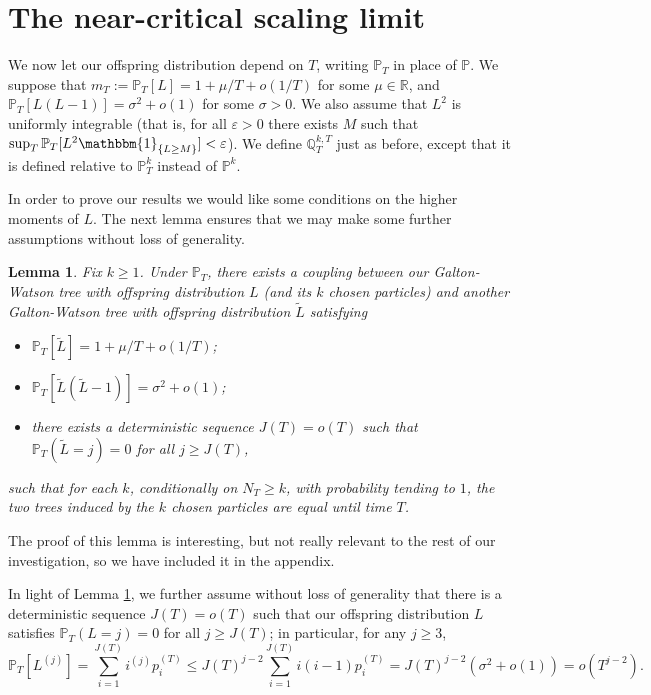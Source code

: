 \documentclass{article}
\theoremstyle{plain}
\newtheorem{lem}[thm]{Lemma}
\theoremstyle{definition}
\newcommand{\Q}{\mathbb{Q}}
\renewcommand{\P}{\mathbb{P}}
\newcommand{\R}{\mathbb{R}}
\newcommand{\ind}{\mathbbm{1}}
\newcommand{\eps}{\varepsilon}
\begin{document}
\section{The near-critical scaling limit}\label{nearcritsec}

We now let our offspring distribution depend on $T$, writing $\P_T$ in place of $\P$. We suppose that $m_T := \P_T[L] = 1+\mu/T + o(1/T)$ for some $\mu\in\R$, and $\P_T[L(L-1)] = \sigma^2 + o(1)$ for some $\sigma>0$. We also assume that $L^2$ is uniformly integrable (that is, for all $\eps>0$ there exists $M$ such that $\sup_T \P_T[L^2\ind_{\{L\ge M\}}]<\eps$). We define $\Q^{k,T}_T$ just as before, except that it is defined relative to $\P^k_T$ instead of $\P^k$.

In order to prove our results we would like some conditions on the higher moments of $L$. The next lemma ensures that we may make some further assumptions without loss of generality.

\begin{lem}\label{momrelax}
Fix $k\ge 1$. Under $\P_T$, there exists a coupling between our Galton-Watson tree with offspring distribution $L$ (and its $k$ chosen particles) and another Galton-Watson tree with offspring distribution $\tilde L$ satisfying
\begin{itemize}
\item $\P_T[\tilde L] = 1+\mu/T + o(1/T)$;
\item $\P_T[\tilde L(\tilde L-1)] = \sigma^2 + o(1)$;
\item there exists a deterministic sequence $J(T)=o(T)$ such that $\P_T(\tilde L = j) = 0$ for all $j\ge J(T)$,
\end{itemize}
such that for each $k$, conditionally on $N_T\ge k$, with probability tending to $1$, the two trees induced by the $k$ chosen particles are equal until time $T$.
\end{lem}

The proof of this lemma is interesting, but not really relevant to the rest of our investigation, so we have included it in the appendix.

In light of Lemma \ref{momrelax}, we further assume without loss of generality that there is a deterministic sequence $J(T)=o(T)$ such that our offspring distribution $L$ satisfies $\P_T(L=j)=0$ for all $j\ge J(T)$; in particular, for any $j\ge 3$,
\begin{equation}\label{momcond}
\P_T[L^{(j)}] = \sum_{i=1}^{J(T)}i^{(j)}p^{(T)}_i \le J(T)^{j-2}\sum_{i=1}^{J(T)}i(i-1)p^{(T)}_i = J(T)^{j-2}(\sigma^2+o(1)) = o(T^{j-2}).
\end{equation}
\end{document}
